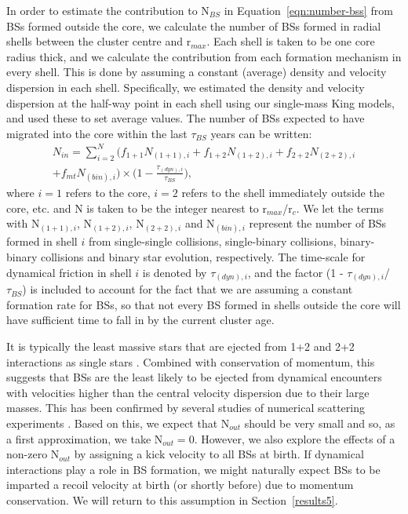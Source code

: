 In order to estimate the contribution to N$_{BS}$ in
Equation~\ref{eqn:number-bss} from BSs formed outside the core, we
calculate the number of BSs formed in radial shells between the
cluster centre and r$_{max}$.  Each shell is taken to be one core
radius thick, and we calculate the contribution from 
each formation mechanism in every shell.  This is done by assuming a
constant (average) density and velocity dispersion in each shell.
Specifically, we estimated the density and velocity 
dispersion at the half-way point in each shell using our single-mass King models,
and used these to set average values.  The number of BSs expected to
have migrated into the core within the last $\tau_{BS}$ years can be
written:
\begin{equation}
\begin{gathered}
\label{eqn:N-in}
N_{in} = \sum_{i=2}^N \Big( f_{1+1}N_{(1+1),i} + f_{1+2}N_{(1+2),i} +
f_{2+2}N_{(2+2),i} \\ 
+ f_{mt}N_{(bin),i} \Big) \times \Big(1 -
\frac{\tau_{(dyn),i}}{\tau_{BS}}\Big),
\end{gathered}
\end{equation}
where $i=1$ refers to the core, $i=2$ refers to the shell immediately 
outside the core, etc. and N is taken to be the integer nearest to
r$_{max}$/r$_c$.  We let the terms with N$_{(1+1),i}$, N$_{(1+2),i}$,
N$_{(2+2),i}$ and 
N$_{(bin),i}$ represent the number of BSs formed in shell $i$ from
single-single collisions, single-binary collisions, binary-binary
collisions and binary star evolution, respectively.  The time-scale
for dynamical friction in shell $i$ is denoted by $\tau_{(dyn),i}$, and
the factor (1 - $\tau_{(dyn),i}$/$\tau_{BS}$) is included to account for
the fact that we are assuming a constant formation rate for BSs, so
that not every BS formed in shells outside the core will have
sufficient time to fall in by the current cluster age.

It is typically the least massive stars
that are ejected from 1+2 and 2+2 interactions as single stars
\citep[e.g.][]{sigurdsson93}.  Combined with conservation of momentum,
this suggests that BSs are the least likely to be ejected from
dynamical encounters with velocities higher than the central velocity
dispersion due to their large masses.  This has been confirmed by
several studies of numerical scattering experiments 
\citep[e.g.][]{hut83, fregeau04}.  Based on this, we 
expect that N$_{out}$ should be 
very small and so, as a first approximation, we take N$_{out} = 0$.
However, we also explore the effects of a 
non-zero N$_{out}$ by assigning a kick velocity to all BSs at birth.
If dynamical interactions play a role in BS formation, we 
might naturally expect BSs to be imparted a recoil velocity at birth
(or shortly before) due to 
momentum conservation.  We will return to this assumption in
Section~\ref{results5}. 

